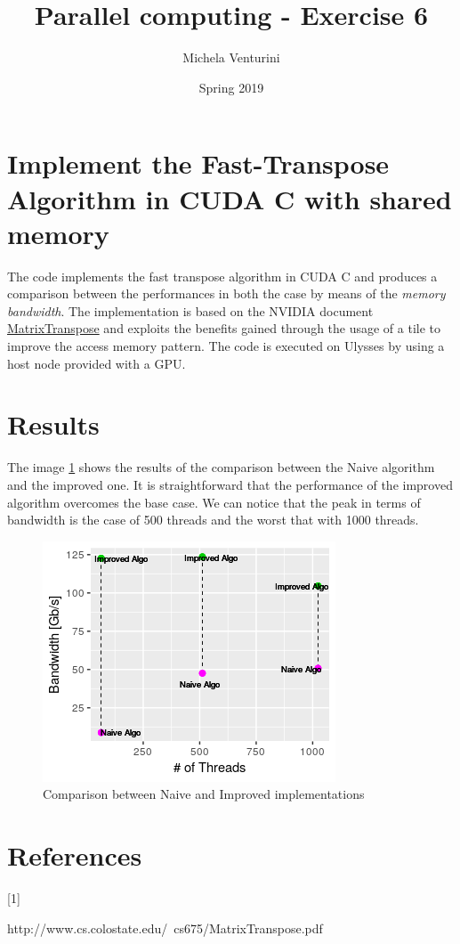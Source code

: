 \documentclass[]{scrartcl}
\title{\textbf{Parallel computing - Exercise 6}}
\author{Michela Venturini}
\date{Spring 2019}
\begin{document}
\maketitle
\section{Implement the Fast-Transpose Algorithm in CUDA C with shared memory}
 The code implements the fast transpose algorithm in CUDA C and produces a comparison between the performances in both the case by means of the \textit{memory bandwidth}. The implementation is based on the NVIDIA document \hyperlink{mt}{MatrixTranspose} and exploits the benefits gained through the usage of a tile to improve the access memory pattern. The code is executed on Ulysses by using a host node provided with a GPU.
\section{Results}
The image \ref{fig_1} shows the results of the comparison between the Naive algorithm and the improved one. It is straightforward that the performance of the improved algorithm overcomes the base case. We can notice that the peak in terms of bandwidth is the case of 500 threads and the worst that with 1000 threads. 
 \begin{figure}[]
	\begin{centering}
		\includegraphics[scale=1]{plot6}
		\caption{Comparison between Naive and Improved implementations}
		\label{fig_1}
	\end{centering}
\end{figure}


\section{References}
\hypertarget{mt}{[1] }http://www.cs.colostate.edu/~cs675/MatrixTranspose.pdf
\end{document}
